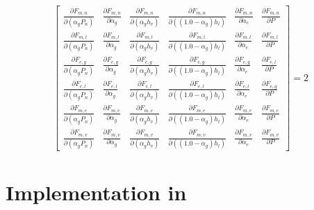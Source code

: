 \begin{equation}
\label{eqn:jacobianWithFluxTerms}
\begin{bmatrix}
\frac{\partial F_{m,n}}{\partial (\alpha_g P_{n})} & \frac{\partial F_{m,n}}{\partial \alpha_g } & \frac{\partial F_{m,n}}{\partial (\alpha_g h_v)} & \frac{\partial F_{m,n}}{\partial ((1.0 - \alpha_g) h_l) } & \frac{\partial F_{m,n}}{\partial \alpha_e } & \frac{\partial F_{m,n}}{\partial P } \\
\frac{\partial F_{m,l}}{\partial (\alpha_g P_{n})} & \frac{\partial F_{m,l}}{\partial \alpha_g } & \frac{\partial F_{m,l}}{\partial (\alpha_g h_v)} & \frac{\partial F_{m,l}}{\partial ((1.0 - \alpha_g) h_l)} &\frac{\partial F_{m,l}}{\partial \alpha_e } & \frac{\partial F_{m,l}}{\partial P } \\
\frac{\partial F_{e,g}}{\partial (\alpha_g P_{n})} & \frac{\partial F_{e,g}}{\partial \alpha_g } & \frac{\partial F_{e,g}}{\partial (\alpha_g h_v)} & \frac{\partial F_{e,g}}{\partial ((1.0 - \alpha_g) h_l)} &\frac{\partial F_{e,g}}{\partial \alpha_e } & \frac{\partial F_{e,l}}{\partial P } \\
\frac{\partial F_{e,l}}{\partial (\alpha_g P_{n})} & \frac{\partial F_{e,l}}{\partial \alpha_g } & \frac{\partial F_{e,l}}{\partial (\alpha_g h_v)} & \frac{\partial F_{e,l}}{\partial ((1.0 - \alpha_g) h_l)} &\frac{\partial F_{e,l}}{\partial \alpha_e } & \frac{\partial F_{e,g}}{\partial P } \\
\frac{\partial F_{m,e}}{\partial (\alpha_g P_{n})} & \frac{\partial F_{m,e}}{\partial \alpha_g } & \frac{\partial F_{m,e}}{\partial (\alpha_g h_v)} & \frac{\partial F_{m,e}}{\partial ((1.0 - \alpha_g) h_l)} &\frac{\partial F_{m,e}}{\partial \alpha_e } & \frac{\partial F_{m,e}}{\partial P } \\
\frac{\partial F_{m,v}}{\partial (\alpha_g P_{n})} & \frac{\partial F_{m,v}}{\partial \alpha_g } & \frac{\partial F_{m,v}}{\partial (\alpha_g h_v)} & \frac{\partial F_{m,v}}{\partial ((1.0 - \alpha_g) h_l)} & \frac{\partial F_{m,v}}{\partial \alpha_e } & \frac{\partial F_{m,v}}{\partial P }
\end{bmatrix}
= 2
\end{equation}
 
 

\section{Implementation in \cobra{}}
\label{sec:dd_algo}


